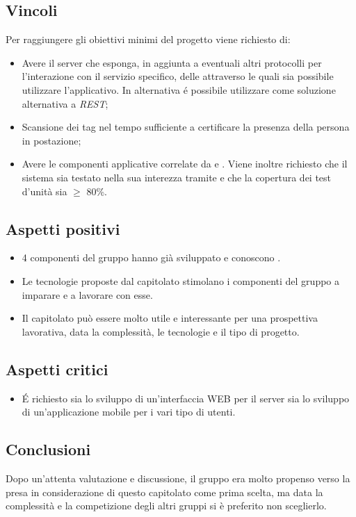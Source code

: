 \subsection{Vincoli}
Per raggiungere gli obiettivi minimi del progetto viene richiesto di:
\begin{itemize}
\item Avere il server che esponga, in aggiunta a eventuali altri protocolli per l’interazione con il servizio specifico, delle  \textit{} attraverso le quali sia possibile utilizzare l'applicativo. In alternativa \'e possibile utilizzare  come soluzione alternativa a \textit{REST};
\item Scansione dei tag nel tempo sufficiente a certificare la presenza della persona in postazione;
\item Avere le componenti applicative correlate da  e . Viene inoltre richiesto che il sistema sia testato nella sua interezza tramite  e che la copertura dei test d'unità sia $\geq$ 80\%.
\end{itemize}

\subsection{Aspetti positivi}
\begin{itemize} 
	\item 4 componenti del gruppo hanno già sviluppato e conoscono .
	\item Le tecnologie proposte dal capitolato stimolano i componenti del gruppo a imparare e a lavorare con esse.
	\item Il capitolato può essere molto utile e interessante per una prospettiva lavorativa, data la complessità, le tecnologie e il tipo di progetto.
\end{itemize}

\subsection{Aspetti critici}
\begin{itemize}
\item \'E richiesto sia lo sviluppo di un'interfaccia WEB per il server sia lo sviluppo di un'applicazione mobile per i vari tipo di utenti.
\end{itemize}

\subsection{Conclusioni}
Dopo un'attenta valutazione e discussione, il gruppo era molto propenso verso la presa in considerazione di questo capitolato come prima scelta, ma data la complessità e la competizione degli altri gruppi si è preferito non sceglierlo.
